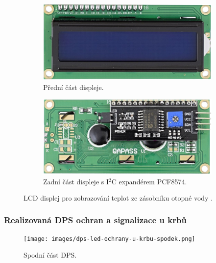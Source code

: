 \begin{figure}[H]
\centering
\begin{subfigure}{.5\textwidth}
  \centering
  \includegraphics[width=0.9\linewidth]{images/predni-cast-lcd-displeje.png}
  \caption{Přední část displeje.}
  \label{fig:predni-cast-lcd-displeje}
\end{subfigure}%
\begin{subfigure}{.5\textwidth}
  \centering
  \includegraphics[width=0.9\linewidth]{images/zadni-cast-lcd-displeje-s-expanderem-pcf8574.png}
  \caption{Zadní část displeje s I$^2$C expandérem PCF8574.}
  \label{fig:zadni-cast-lcd-displeje-s-expanderem-pcf857}
\end{subfigure}
\caption[LCD displej pro zobrazování teplot ze zásobníku otopné vody.]{LCD displej pro zobrazování teplot ze zásobníku otopné vody \cite{lcd-displej}.}
\label{fig:lcd-displej}
\end{figure}

\subsubsection{Realizovaná DPS ochran a signalizace u krbů}

\begin{figure}[H]
    \centering
    \texttt{[image: images/dps-led-ochrany-u-krbu-spodek.png]}
    \caption{Spodní část DPS.}
    \label{fig:dps-led-ochrany-u-krbu-spodek}
\end{figure}

